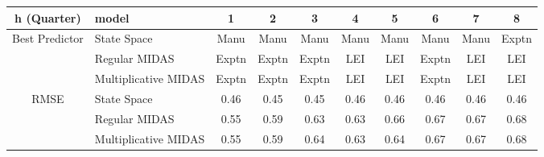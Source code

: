 \begin{table}[ht]
\centering
\small
\begin{tabular}{clcccccccc}
\hline
h (Quarter) & model & 1 & 2 & 3 & 4 & 5 & 6 & 7 & 8 \\
\hline
\hline
Best Predictor & State Space & Manu & Manu & Manu & Manu & Manu & Manu & Manu & Exptn \\
 & Regular MIDAS & Exptn & Exptn & Exptn & LEI & LEI & Exptn & LEI & LEI \\
 & Multiplicative MIDAS & Exptn & Exptn & Exptn & LEI & LEI & Exptn & LEI & LEI \\
\hline
RMSE & State Space & 0.46 & 0.45 & 0.45 & 0.46 & 0.46 & 0.46 & 0.46 & 0.46 \\
 & Regular MIDAS & 0.55 & 0.59 & 0.63 & 0.63 & 0.66 & 0.67 & 0.67 & 0.68 \\
 & Multiplicative MIDAS & 0.55 & 0.59 & 0.64 & 0.63 & 0.64 & 0.67 & 0.67 & 0.68 \\
\hline
\end{tabular}
\end{table}
